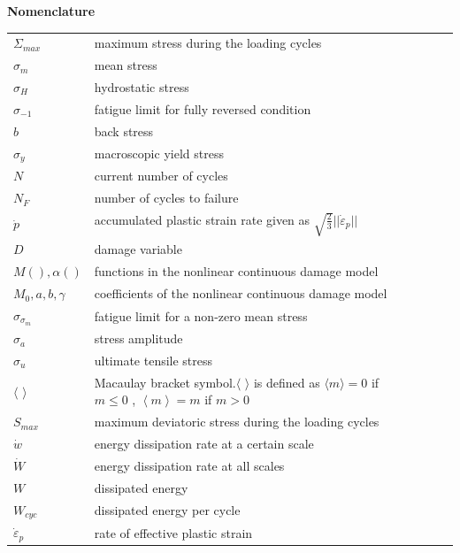 \documentclass[3p,times,procedia,number]{elsarticle}
\begin{document}
\clearpage
\begin{flushleft}
	\textbf{Nomenclature}
	\vspace{6pt}
	\begin{table}[h]
		\begin{tabular}{lllll}
			$\Sigma_{max}$ & maximum stress during the loading cycles &  &  &  \\
			$\sigma_m$ & mean stress &  &  &  \\
			$\sigma_H$ & hydrostatic stress &  &  &  \\
			$\sigma_{-1}$ & fatigue limit for fully reversed condition  &  &  &  \\
			$b$ & back stress  &  &  &  \\
			$\sigma_{y}$ & macroscopic yield stress &  &  &  \\
		    $N$& current number of cycles &  &  &  \\
			$N_F$& number of cycles to failure &  &  &  \\
			 $\dot{p}$ & accumulated plastic strain rate given as $\sqrt{\frac{2}{3}}||\dot{\varepsilon}_p||$ &  &  &  \\
			$D$ & damage variable  &  &  &  \\
			$M(),\alpha()$& functions in the nonlinear continuous damage model &  &  &  \\
			$M_0,a,b,\gamma$ & coefficients of the nonlinear continuous damage model &  &  &  \\
			$\sigma_{\sigma_m}$ & fatigue limit for a non-zero mean stress  &  &  &  \\
			$\sigma_{a}$ & stress amplitude &  &  &  \\
			$\sigma_{u}$ & ultimate tensile stress &  &  &  \\
			$\langle$ $\rangle$& Macaulay bracket symbol.$\langle$ $\rangle$ is defined as $\langle m\rangle=0$ if $m\leqslant0$ , $\left\langle m\right\rangle=m$ if $m>0$&  &  &  \\
						$S_{max}$ & maximum deviatoric stress during the loading cycles &  &  &  \\
						$\dot{w}$ & energy dissipation rate at a certain scale &  &  &  \\
						$\dot{W}$ & energy dissipation rate at all scales &  &  &  \\
						$W$ & dissipated energy&  &  &  \\
						$W_{cyc}$ & dissipated energy per cycle &  &  &  \\
						$ \dot{\varepsilon}_p$ & rate of effective plastic strain &  &  &  \\

\end{tabular}
\end{table}
\end{flushleft}
\end{document}
